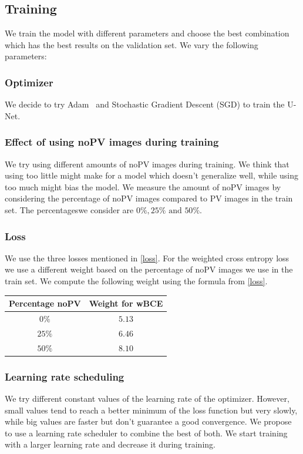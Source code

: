 \documentclass[10pt,conference]{IEEEtran}
\begin{document}
\subsection{Training}
We train the model with different parameters and choose the best combination which has the best results on the validation set. We vary the following parameters:

\subsubsection{Optimizer}
We decide to try Adam~\cite{kingma2014adam} and Stochastic Gradient Descent (SGD) to train the U-Net.

\subsubsection{Effect of using noPV images during training}
We try using different amounts of noPV images during training. We think that using too little might make for a model which doesn't generalize well, while using too much might bias the model. We measure the amount of noPV images by considering the percentage of noPV images compared to PV images in the train set. The percentageswe consider are $0\%, 25\% \text{ and } 50\%$.

\subsubsection{Loss}
We use the three losses mentioned in \autoref{loss}. For the weighted cross entropy loss we use a different weight based on the percentage of noPV images we use in the train set. We compute the following weight using the formula from \autoref{loss}.
\begin{center}
    \begin{tabular}{||c | c||} 
        \hline
        Percentage noPV & Weight for wBCE\\ [0.5ex] 
        \hline\hline
        $0\%$ & $5.13$ \\
        \hline
        $25\%$ & $6.46$ \\
        \hline
        $50\%$ & $8.10$ \\
        \hline
    \end{tabular}
\end{center}

\subsubsection{Learning rate scheduling}
We try different constant values of the learning rate of the optimizer. However, small values tend to reach a better minimum of the loss function but very slowly, while big values are faster but don't guarantee a good convergence. We propose to use a learning rate scheduler to combine the best of both. We start training with a larger learning rate and decrease it during training.
\end{document}
